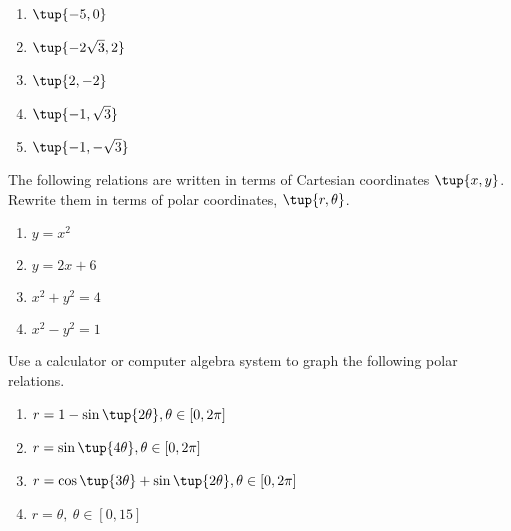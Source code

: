 \begin{enumialphparenastyle}
\begin{ex}
\begin{enumerate}
\item $\tup{-5,0} $

\item $\tup{-2\sqrt{3},2} $

\item $\tup{2,-2} $

\item $\tup{-1,\sqrt{3}} $

\item $\tup{-1,-\sqrt{3}} $
\end{enumerate}
\end{ex}

\begin{ex} The following relations are written in terms of Cartesian coordinates $\tup{x, y }$. Rewrite them in terms of polar coordinates, $\tup{r, \theta }$. 

\begin{enumerate}
\item $y=x^{2}$

\item $y=2x+6$

\item $x^{2}+y^{2}=4$

\item $x^{2}-y^{2}=1$
\end{enumerate}
\end{ex}

\begin{ex} Use a calculator or computer algebra system to graph the following
polar relations.

\begin{enumerate}
\item $r=1-\sin \tup{2\theta } ,\theta \in \left[ 0,2\pi \right] $

\item $r=\sin \tup{4\theta } ,\theta \in \left[ 0,2\pi \right] $ 

\item $r=\cos \tup{3\theta } +\sin \tup{2\theta } ,\theta
\in \left[ 0,2\pi \right] $

\item $r=\theta ,\ \theta \in \left[ 0,15\right] $
\end{enumerate}
\end{ex}


\end{enumialphparenastyle}
